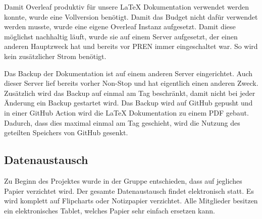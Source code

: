 Damit Overleaf produktiv für unsere LaTeX Dokumentation verwendet werden konnte, wurde eine Vollversion benötigt. Damit das Budget nicht dafür verwendet werden musste, wurde eine eigene Overleaf Instanz aufgesetzt. Damit diese möglichst nachhaltig läuft, wurde sie auf einem Server aufgesetzt, der einen anderen Hauptzweck hat und bereits vor PREN immer eingeschaltet war. So wird kein zusätzlicher Strom benötigt.

Das Backup der Dokumentation ist auf einem anderen Server eingerichtet. Auch dieser Server lief bereits vorher Non-Stop und hat eigentlich einen anderen Zweck. Zusätzlich wird das Backup auf einmal am Tag beschränkt, damit nicht bei jeder Änderung ein Backup gestartet wird. Das Backup wird auf GitHub gepusht und in einer GitHub Action wird die LaTeX Dokumentation zu einem PDF gebaut. Dadurch, dass dies maximal einmal am Tag geschieht, wird die Nutzung des geteilten Speichers von GitHub gesenkt.

\subsection{Datenaustausch}

Zu Beginn des Projektes wurde in der Gruppe entschieden, dass auf jegliches Papier verzichtet wird. Der gesamte Datenaustausch findet elektronisch statt. Es wird komplett auf Flipcharts oder Notizpapier verzichtet. Alle Mitglieder besitzen ein elektronisches Tablet, welches Papier sehr einfach ersetzen kann.